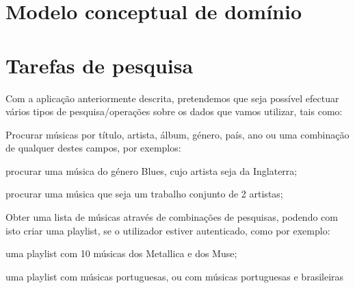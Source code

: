 \documentclass[twocolumn,twoside,11pt,a4paper]{article}
\begin{document}

\section{Modelo conceptual de domínio}\label{sec:concept_model}


\section{Tarefas de pesquisa}\label{sec:searches}

Com a aplicação anteriormente descrita, pretendemos que seja possível efectuar vários
tipos de pesquisa/operações sobre os dados que vamos utilizar, tais como:
\begin{compactitem}
  \item Procurar músicas por título, artista, álbum, género, país, ano ou uma combinação
    de qualquer destes campos, por exemplos:
    \begin{compactitem}
      \item procurar uma música do género Blues, cujo artista seja da Inglaterra;
      \item procurar uma música que seja um trabalho conjunto de 2 artistas;
    \end{compactitem}

  \item Obter uma lista de músicas através de combinações de pesquisas, podendo com
    isto criar uma playlist, se o utilizador estiver autenticado, como por exemplo:
    \begin{compactitem}
      \item uma playlist com 10 músicas dos Metallica e dos Muse;
      \item uma playlist com músicas portuguesas, ou com músicas portuguesas e
        brasileiras
    \end{compactitem}


\end{compactitem}
\end{document}

